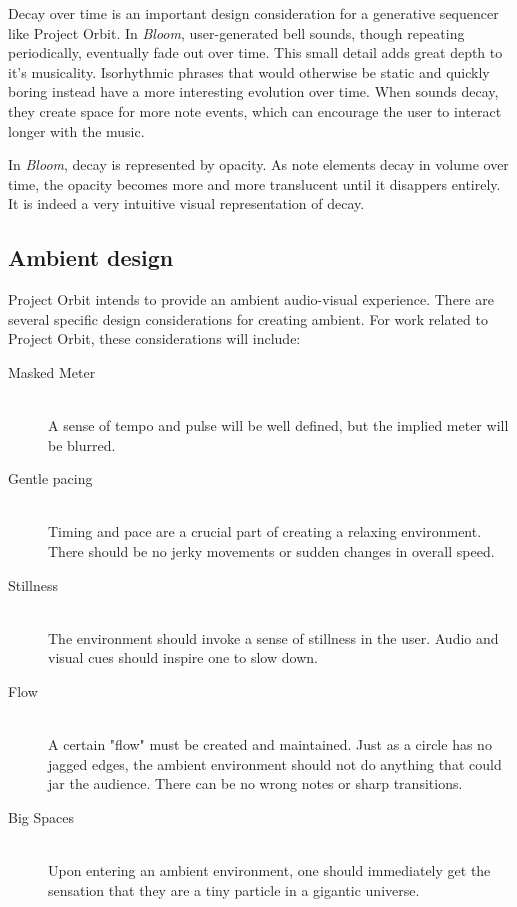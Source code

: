 \documentclass[11pt, twocolumn]{article}
\begin{document}
Decay over time is an important design consideration for a generative sequencer like 
Project Orbit. In \emph{Bloom}, user-generated bell sounds, 
though repeating periodically, eventually fade out over time. This small detail
adds great depth to it's musicality. Isorhythmic phrases that would otherwise be 
static and quickly boring instead have a more interesting evolution over time. When
sounds decay, they create space for more note events, which can encourage the user
to interact longer with the music.

In \emph{Bloom}, decay is represented by opacity. As note elements decay in volume 
over time, the opacity becomes more and more translucent until it disappers entirely.
It is indeed a very intuitive visual representation of decay. 

\subsection{Ambient design}
Project Orbit intends to provide an ambient audio-visual experience. There are several specific design considerations for creating ambient. For work related to Project Orbit, 
these considerations will include:

\begin{description}
    \item[Masked Meter] \hfill \\
        A sense of tempo and pulse will be well defined, but the implied meter
will be blurred. 
    \item[Gentle pacing] \hfill \\
        Timing and pace are a crucial part of creating a relaxing environment. 
There should be no jerky movements or sudden changes in overall speed. 
    \item[Stillness] \hfill \\
        The environment should invoke a sense of stillness in the user. Audio and
visual cues should inspire one to slow down.
 
    \item[Flow] \hfill \\
        A certain "flow" must be created and maintained. Just as a circle has no 
jagged edges, the ambient environment should not do anything that could jar the
audience. There can be no wrong notes or sharp transitions. 

    \item[Big Spaces] \hfill \\
       Upon entering an ambient environment, one should immediately get the 
sensation that they are a tiny particle in a gigantic universe. 
\end{description}
\end{document}

